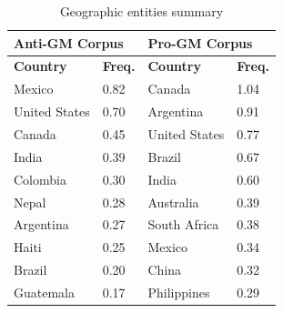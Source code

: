 \begin{table}[h]
\begin{footnotesize}
\centering
\begin{tabular}{|l|l|l|l|}
\hline
\multicolumn{2}{|l|}{\textbf{Anti-GM Corpus}} & \multicolumn{2}{l|}{\textbf{Pro-GM Corpus}} \\ \hline
\textbf{Country}       & \textbf{Freq.}       & \textbf{Country}      & \textbf{Freq.}      \\ \hline
Mexico                 & 0.82                  & Canada         & 1.04                \\ \hline
United States          & 0.70                 & Argentina                & 0.91               \\ \hline
Canada                 & 0.45                 & United States                & 0.77                \\ \hline
India                  & 0.39                 & Brazil             & 0.67                 \\ \hline
Colombia               & 0.30                 & India                 & 0.60                 \\ \hline
Nepal                  & 0.28                 & Australia                & 0.39                \\ \hline
Argentina              & 0.27                 & South Africa              & 0.38                 \\ \hline
Haiti                  & 0.25                 & Mexico             & 0.34                \\ \hline
Brazil                 & 0.20                 & China          & 0.32                \\ \hline
Guatemala              & 0.17                 & Philippines                 & 0.29                \\ \hline
\end{tabular}
\caption{Geographic entities summary}
\label{tab:table1}
\end{footnotesize}
\end{table}

